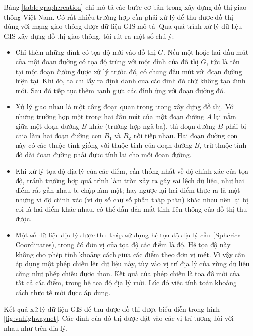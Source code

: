 \documentclass[14pt, oneside, a4paper, openany]{scrartcl}
\begin{document}
Bảng \ref{table:graphcreation} chỉ mô tả các bước cơ bản trong xây dựng đồ thị giao thông Việt Nam. Có rất nhiều trường hợp cần phải xử lý để thu được đồ thị đúng với mạng giao thông được dữ liệu GIS mô tả. Qua quá trình xử lý dữ liệu GIS xây dựng đồ thị giao thông, tôi rút ra một số chú ý:
\begin{itemize}
	\item Chỉ thêm những đỉnh có tọa độ mới vào đồ thị $G$. Nếu một hoặc hai đầu mút của một đoạn đường có tọa độ trùng với một đỉnh của đồ thị $G$, tức là tồn tại một đoạn đường được xử lý trước đó, có chung đầu mút với đoạn đường hiện tại. Khi đó, ta chỉ lấy ra định danh của các đỉnh đó chứ không tạo đỉnh mới. Sau đó tiếp tục thêm cạnh giữa các đỉnh ứng với đoạn đường đó.
	
	\item Xử lý giao nhau là một công đoạn quan trọng trong xây dựng đồ thị. Với những trường hợp một trong hai đầu mút của một đoạn đường $A$ lại nằm giữa một đoạn đường $B$ khác (trường hợp ngã ba), thì đoạn đường $B$ phải bị chia làm hai đoạn đường con $B_1$ và $B_2$ nối tiếp nhau. Hai đoạn đường con này có các thuộc tính giống với thuộc tính của đoạn đường $B$, trừ thuộc tính độ dài đoạn đường phải được tính lại cho mỗi đoạn đường.
	
	\item Khi xử lý tọa độ địa lý của các điểm, cần thống nhất về độ chính xác của tọa độ, tránh trường hợp quá trình làm tròn xảy ra gây sai lệch dữ liệu, như hai điểm rất gần nhau bị chập làm một; hay ngược lại hai điểm thực ra là một nhưng vì độ chính xác (ví dụ số chữ số phần thập phân) khác nhau nên lại bị coi là hai điểm khác nhau, có thể dẫn đến mất tính liên thông của đồ thị thu được.
	
	\item Một số dữ liệu địa lý được thu thập sử dụng hệ tọa độ địa lý cầu (Spherical Coordinates), trong đó đơn vị của tọa độ các điểm là độ. Hệ tọa độ này không cho phép tính khoảng cách giữa các điểm theo đơn vị mét. Vì vậy cần áp dụng một phép chiếu lên dữ liệu này, tùy vào vị trí địa lý của vùng dữ liệu cũng như phép chiếu được chọn. Kết quả của phép chiếu là tọa độ mới của tất cả các điểm, trong hệ tọa độ địa lý mới. Lúc đó việc tính toán khoảng cách thực tế mới được áp dụng.
\end{itemize}

Kết quả xử lý dữ liệu GIS để thu được đồ thị được biểu diễn trong hình \ref{fig:vnhighwaynet}. Các đỉnh của đồ thị được đặt vào các vị trí tương đối với nhau như trên địa lý.
\end{document}
